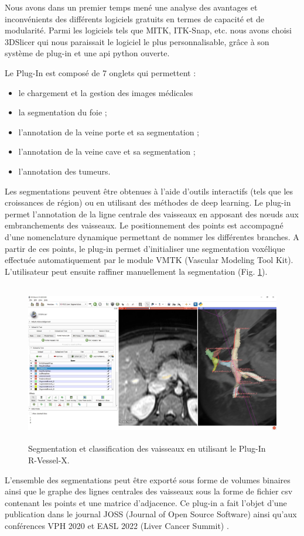 Nous avons dans un premier temps mené une analyse des avantages et inconvénients des différents logiciels gratuits en termes de capacité et de modularité. Parmi les logiciels tels que MITK, ITK-Snap, etc. nous avons choisi 3DSlicer qui nous paraissait le logiciel le plus personnalisable, grâce à son système de plug-in et une api python ouverte.

Le Plug-In est composé de 7 onglets qui permettent :

\begin{itemize}
    \item le chargement et la gestion des images médicales
    \item la segmentation du foie ;
    \item l'annotation de la veine porte et sa segmentation ;
    \item l'annotation de la veine cave et sa segmentation ;
    \item l'annotation des tumeurs.
\end{itemize}

Les segmentations peuvent être obtenues à l'aide d'outils interactifs (tels que les croissances de région) ou en utilisant des méthodes de deep learning. 
Le plug-in permet l'annotation de la ligne centrale des vaisseaux en apposant des nœuds aux embranchements des vaisseaux. Le positionnement des points est accompagné d'une nomenclature dynamique permettant de nommer les différentes branches. A partir de ces points, le plug-in permet d'initialiser une segmentation voxélique effectuée automatiquement par le module VMTK (Vascular Modeling Tool Kit). L'utilisateur peut ensuite raffiner manuellement la segmentation (Fig. \ref{fig:slicer_plug_in}).

\begin{figure}[H]
    \includegraphics[height=7cm]{Images/plug_in_segmentation.png}
    \caption{Segmentation et classification des vaisseaux en utilisant le Plug-In R-Vessel-X.}
    \label{fig:slicer_plug_in}
\end{figure}

L'ensemble des segmentations peut être exporté sous forme de volumes binaires ainsi que le graphe des lignes centrales des vaisseaux sous la forme de fichier csv contenant les points et une matrice d'adjacence.
Ce plug-in a fait l'objet d'une publication dans le journal JOSS (Journal of Open Source Software) \cite{Lamy2022_JOSS} ainsi qu'aux conférences VPH 2020 \cite{Lamy2020_VPH_plugin} et EASL 2022 (Liver Cancer Summit) \cite{Lamy2022_EASL}.




